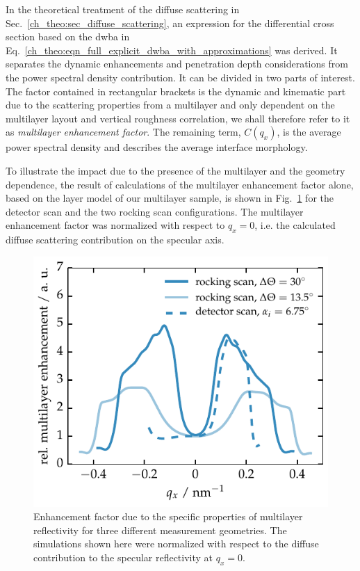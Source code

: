 In the theoretical treatment of the diffuse scattering in Sec.~\ref{ch_theo:sec_diffuse_scattering}, an expression for the differential cross section based on the \gls{dwba} in Eq.~\eqref{ch_theo:eqn_full_explicit_dwba_with_approximations} was derived. It separates the dynamic enhancements and penetration depth considerations from the power spectral density contribution. It can be divided in two parts of interest. The factor contained in rectangular brackets is the dynamic and kinematic part due to the scattering properties from a multilayer and only dependent on the multilayer layout and vertical roughness correlation, we shall therefore refer to it as \emph{multilayer enhancement factor}. The remaining term, $C(q_x)$, is the average power spectral density and describes the average interface morphology.

To illustrate the impact due to the presence of the multilayer and the geometry dependence, the result of calculations of the multilayer enhancement factor alone, based on the layer model of our multilayer sample, is shown in Fig.~\ref{ch_diff:fig_PTB17_multilayer_enhancement_factor} for the detector scan and the two rocking scan configurations. The multilayer enhancement factor was normalized with respect to $q_x=0$, i.e. the calculated diffuse scattering contribution on the specular axis.
\begin{figure}[htbp]
	\includegraphics{img/PTB17_multilayer_enhancement_factor} \caption[Multilayer enhancement factor for three different measurement geometries.]{Enhancement factor due to the specific properties of multilayer reflectivity for three different measurement geometries. The simulations shown here were normalized with respect to the diffuse contribution to the specular reflectivity at $q_x=0$.} \label{ch_diff:fig_PTB17_multilayer_enhancement_factor} 
\end{figure}
